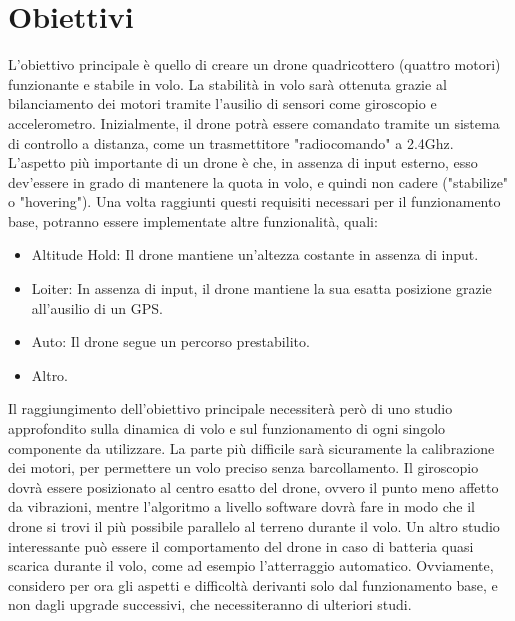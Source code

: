 \documentclass[]{article}
\begin{document}
\section{Obiettivi}
L'obiettivo principale è quello di creare un drone quadricottero (quattro motori) funzionante e stabile in volo. La stabilità in volo sarà ottenuta grazie al bilanciamento dei motori tramite l'ausilio di sensori come giroscopio e accelerometro. Inizialmente, il drone potrà essere comandato tramite un sistema di controllo a distanza, come un trasmettitore "radiocomando" a 2.4Ghz. L'aspetto più importante di un drone è che, in assenza di input esterno, esso dev'essere in grado di mantenere la quota in volo, e quindi non cadere ("stabilize" o "hovering"). 
Una volta raggiunti questi requisiti necessari per il funzionamento base, potranno essere implementate altre funzionalità, quali:
\begin{itemize}
\item Altitude Hold: Il drone mantiene un'altezza costante in assenza di input.
\item Loiter: In assenza di input, il drone mantiene la sua esatta posizione grazie all'ausilio di un GPS.
\item Auto: Il drone segue un percorso prestabilito.
\item Altro.
\end{itemize}
Il raggiungimento dell'obiettivo principale necessiterà però di uno studio approfondito sulla dinamica di volo e sul funzionamento di ogni singolo componente da utilizzare. La parte più difficile sarà sicuramente la calibrazione dei motori, per permettere un volo preciso senza barcollamento. Il giroscopio dovrà essere posizionato al centro esatto del drone, ovvero il punto meno affetto da vibrazioni, mentre l'algoritmo a livello software dovrà fare in modo che il drone si trovi il più possibile parallelo al terreno durante il volo. Un altro studio interessante può essere il comportamento del drone in caso di batteria quasi scarica durante il volo, come ad esempio l'atterraggio automatico. 
Ovviamente, considero per ora gli aspetti e difficoltà derivanti solo dal funzionamento base, e non dagli upgrade successivi, che necessiteranno di ulteriori studi.
\end{document}

